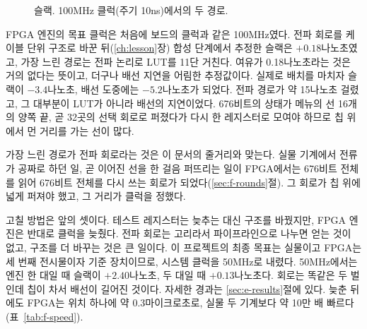 \begin{figure}[ht]
\centering
{}
\caption{슬랙. 100MHz 클럭(주기 10ns)에서의 두 경로.}
\label{fig:g-slack}
\end{figure}

\Ours FPGA 엔진의 목표 클럭은 처음에 보드의 클럭과 같은 100MHz였다. 전파 회로를 케이블 단위 구조로
바꾼 뒤(\ref{ch:lesson}장) 합성 단계에서
추정한 슬랙은 $+0.18$나노초였고, 가장 느린 경로는 전파 논리로 LUT를 11단 거친다. 여유가 0.18나노초라는
것은 거의 없다는 뜻이고, 더구나 배선 지연을 어림한 추정값이다. 실제로 배치를 마치자 슬랙이 $-3.4$나노초,
배선 도중에는 $-5.2$나노초가 되었다. 전파 경로가 약 15나노초 걸렸고, 그 대부분이 LUT가 아니라 배선의
지연이었다. 676비트의 상태가 메뉴의 선 16개의 양쪽 끝, 곧 32곳의 선택 회로로 퍼졌다가 다시 한 레지스터로
모여야 하므로 칩 위에서 먼 거리를 가는 선이 많다.

가장 느린 경로가 전파 회로라는 것은 이 문서의 줄거리와 맞는다. 실물 기계에서 전류가 공짜로 하던 일, 곧
이어진 선을 한 걸음 퍼뜨리는 일이 FPGA에서는 676비트 전체를 읽어 676비트 전체를 다시 쓰는 회로가
되었다(\ref{sec:f-rounds}절). 그 회로가 칩 위에 넓게 퍼져야 했고, 그 거리가 클럭을 정했다.

고칠 방법은 앞의 셋이다. 테스트 레지스터는 늦추는 대신 구조를 바꿨지만, FPGA 엔진은 반대로 클럭을 늦췄다.
전파 회로는 고리라서 파이프라인으로 나누면 얻는 것이 없고, 구조를 더 바꾸는 것은 큰 일이다. 이 프로젝트의
최종 목표는 실물이고 FPGA는 세 번째 전시물이자 기준 장치이므로, 시스템 클럭을 50MHz로 내렸다. 50MHz에서는
엔진 한 대일 때 슬랙이 $+2.40$나노초, 두 대일 때 $+0.13$나노초다. 회로는 똑같은 두 벌인데 칩이 차서 배선이
길어진 것이다. 자세한 경과는 \ref{sec:e-results}절에 있다. 늦춘 뒤에도 FPGA는 위치 하나에 약 0.3마이크로초로,
실물 두 기계보다 약 10만 배 빠르다(표~\ref{tab:f-speed}).

